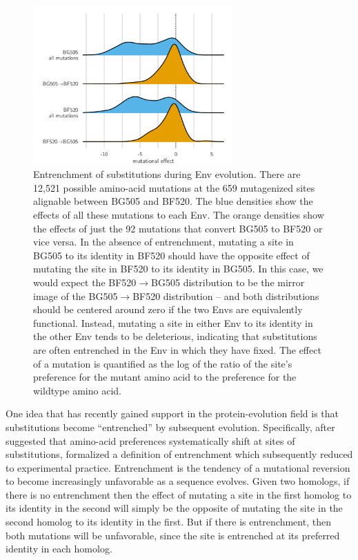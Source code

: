 \documentclass[9pt]{elife}
\begin{document}
\begin{figure}
\centerline{\includegraphics[clip=true, trim=0in 0in 0in 0.7in, width=0.68\textwidth]{figures/entrenchment.pdf}}
\caption{\label{fig:entrenchment}
Entrenchment of substitutions during Env evolution.
There are 12,521 possible amino-acid mutations at the 659 mutagenized sites alignable between BG505 and BF520.
The blue densities show the effects of all these mutations to each Env.
The orange densities show the effects of just the 92 mutations that convert BG505 to BF520 or vice versa.
In the absence of entrenchment, mutating a site in BG505 to its identity in BF520 should have the opposite effect of mutating the site in BF520 to its identity in BG505.
In this case, we would expect the BF520$\rightarrow$BG505 distribution to be the mirror image of the BG505$\rightarrow$BF520 distribution -- and both distributions should be centered around zero if the two Envs are equivalently functional.
Instead, mutating a site in either Env to its identity in the other Env tends to be deleterious, indicating that substitutions are often entrenched in the Env in which they have fixed.
The effect of a mutation is quantified as the log of the ratio of the site's preference for the mutant amino acid to the preference for the wildtype amino acid.
}
\end{figure}

One idea that has recently gained support in the protein-evolution field is that substitutions become ``entrenched'' by subsequent evolution.
Specifically, after \citet{pollock2012amino} suggested that amino-acid preferences systematically shift at sites of substitutions, \citet{shah2015contingency} formalized a definition of entrenchment which \citet{starr2017pervasive} subsequently reduced to experimental practice.
Entrenchment is the tendency of a mutational reversion to become increasingly unfavorable as a sequence evolves.
Given two homologs, if there is no entrenchment then the effect of mutating a site in the first homolog to its identity in the second will simply be the opposite of mutating the site in the second homolog to its identity in the first.
But if there is entrenchment, then both mutations will be unfavorable, since the site is entrenched at its preferred identity in each homolog.
\end{document}
